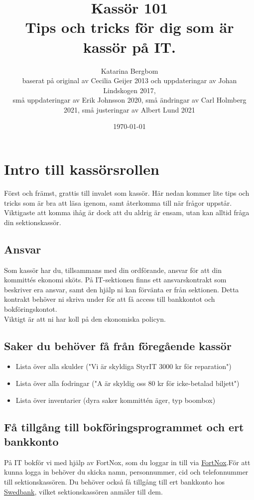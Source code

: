 \documentclass{article}
\title{Kassör 101 \\ \vspace{10pt} \Large{Tips och tricks för dig som är kassör på IT.}}
\author{Katarina Bergbom\\ 
\small{baserat på original av Cecilia Geijer 2013 och uppdateringar av Johan Lindskogen 2017,}\\
\small{små uppdateringar av Erik Johnsson 2020, små ändringar av Carl Holmberg 2021, små justeringar av Albert Lund 2021}}
\date{\today}
\begin{document}
\maketitle

\tableofcontents

\section{Intro till kassörsrollen}
Först och främst, grattis till invalet som kassör. Här nedan kommer lite tips och tricks som är bra att läsa igenom, samt återkomma till när frågor uppstår. Viktigaste att komma ihåg är dock att du aldrig är ensam, utan kan alltid fråga din sektionskassör.   

\subsection*{Ansvar}
Som kassör har du, tillsammans med din ordförande, ansvar för att din kommittés ekonomi sköts. På IT-sektionen finns ett ansvarskontrakt som beskriver era ansvar, samt den hjälp ni kan förvänta er från sektionen. Detta kontrakt behöver ni skriva under för att få access till bankkontot och bokföringskontot. \\

Viktigt är att ni har koll på den ekonomiska policyn. 

\subsection*{Saker du behöver få från föregående kassör}
\begin{itemize}
    \item Lista över alla skulder ("Vi är skyldiga StyrIT 3000 kr för reparation")
    \item Lista över alla fodringar ("A är skyldig oss 80 kr för icke-betalad biljett")
    \item Lista över inventarier (dyra saker kommittén äger, typ boombox)
\end{itemize}

\subsection*{Få tillgång till bokföringsprogrammet och ert bankkonto}
På IT bokför vi med hjälp av FortNox, som du loggar in till via \href{https://fortnox.se}{FortNox}.För att kunna logga in behöver du skicka namn, personnummer, cid och telefonnummer till sektionskassören. Du behöver också få tillgång till ert bankkonto hos \href{https://www.swedbank.se/}{Swedbank}, vilket sektionskassören anmäler till dem. \\
\end{document}
